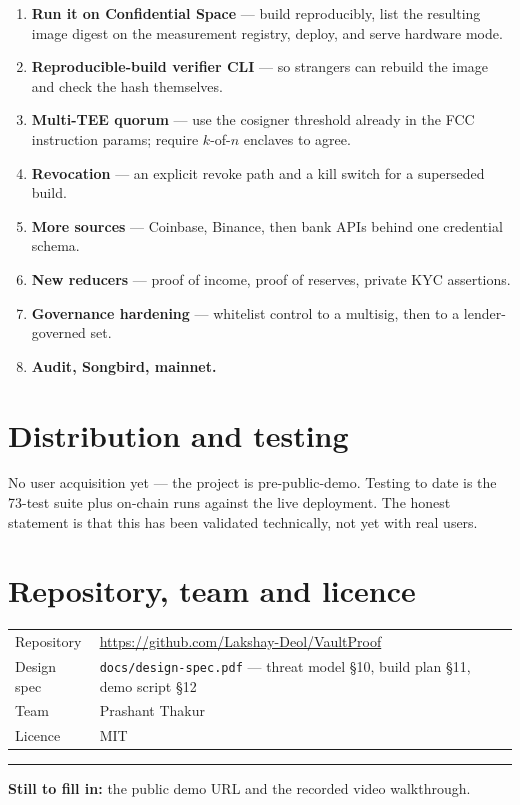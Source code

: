 \documentclass[11pt,a4paper]{article}
\newcommand{\code}[1]{\texttt{\small #1}}
\newcommand{\TeamName}{Prashant Thakur}
\newcommand{\RepoURL}{https://github.com/Lakshay-Deol/VaultProof}
\newcommand{\TestsTotal}{73}
\begin{document}
\begin{enumerate}[leftmargin=1.4em, itemsep=0.35em]
  \item \textbf{Run it on Confidential Space} --- build reproducibly, list the
        resulting image digest on the measurement registry, deploy, and serve
        hardware mode.
  \item \textbf{Reproducible-build verifier CLI} --- so strangers can rebuild
        the image and check the hash themselves.
  \item \textbf{Multi-TEE quorum} --- use the cosigner threshold already in the
        FCC instruction params; require $k$-of-$n$ enclaves to agree.
  \item \textbf{Revocation} --- an explicit revoke path and a kill switch for a
        superseded build.
  \item \textbf{More sources} --- Coinbase, Binance, then bank APIs behind one
        credential schema.
  \item \textbf{New reducers} --- proof of income, proof of reserves, private
        KYC assertions.
  \item \textbf{Governance hardening} --- whitelist control to a multisig, then
        to a lender-governed set.
  \item \textbf{Audit, Songbird, mainnet.}
\end{enumerate}

\section{Distribution and testing}

No user acquisition yet --- the project is pre-public-demo. Testing to date is
the \TestsTotal-test suite plus on-chain runs against the live deployment. The
honest statement is that this has been validated technically, not yet with real
users.

\section{Repository, team and licence}

\begin{tabularx}{\textwidth}{@{}l L@{}}
  \toprule
  Repository    & \url{\RepoURL} \\
  Design spec   & \code{docs/design-spec.pdf} --- threat model \S10, build plan
                  \S11, demo script \S12 \\
  Team          & \TeamName \\
  Licence       & MIT \\
  \bottomrule
\end{tabularx}

\vspace{1.4em}
{\color{rulegrey}\hrule}
\vspace{0.8em}

\noindent
{\small\color{inkmuted}
\textbf{Still to fill in:} the public demo URL and the recorded video
walkthrough.}
\end{document}
